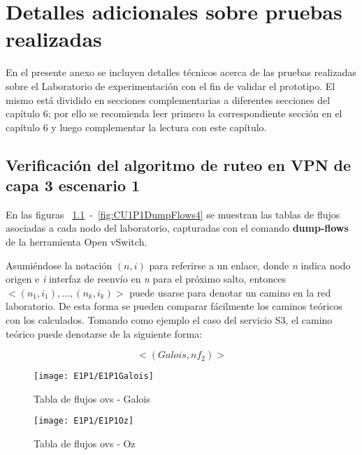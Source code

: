 
\chapter{Detalles adicionales sobre pruebas realizadas}
\label{appendix6}

\ifpdf
    \graphicspath{{Appendix6/Figs/Raster/}{Appendix6/Figs/PDF/}{Appendix6/Figs/}}
\else
    \graphicspath{{Appendix6/Figs/Vector/}{Appendix6/Figs/}}
\fi

En el presente anexo se incluyen detalles t\'ecnicos acerca de las pruebas realizadas sobre el Laboratorio de experimentaci\'on con el fin de validar el prototipo. El mismo est\'a dividido en secciones complementarias a diferentes secciones del cap\'itulo 6; por ello se recomienda leer primero la correspondiente secci\'on en el cap\'itulo 6 y luego complementar la lectura con este cap\'itulo.

\section{Verificación del algoritmo de ruteo en VPN de capa 3 escenario 1}
\label{appendix6.1}
En las figuras ~\ref{fig:CU1P1DumpFlows1}~-~\ref{fig:CU1P1DumpFlows4} se muestran las tablas de flujos asociadas a cada nodo del laboratorio, capturadas con el comando \textbf{dump-flows} de la herramienta Open vSwitch.

Asumiéndose la notaci\'on $(n, i)$ para referirse a un enlace, donde \textit{n} indica nodo origen e \textit{i} interfaz de reenvío en \textit{n} para el próximo salto, entonces $<(n_1, i_1), \dots, (n_k, i_k)>$ puede usarse para denotar un camino en la red laboratorio. De esta forma se pueden comparar f\'acilmente los caminos te\'oricos con los calculados. Tomando como ejemplo el caso del servicio S3, el camino te\'orico puede denotarse de la siguiente forma:
 
$$<(Galois, nf_2)>$$

\newpage
\begin{figure}[ht!] 
\centering    
\texttt{[image: E1P1/E1P1Galois]}
\caption[Tabla de flujos ovs - Galois]{Tabla de flujos ovs - Galois}
\label{fig:CU1P1DumpFlows1}
\end{figure}

\begin{figure}[h!] 
\centering    
\texttt{[image: E1P1/E1P1Oz]}
\caption[Tabla de flujos ovs - Oz]{Tabla de flujos ovs - Oz}
\label{fig:CU1P1DumpFlows2}
\end{figure}

